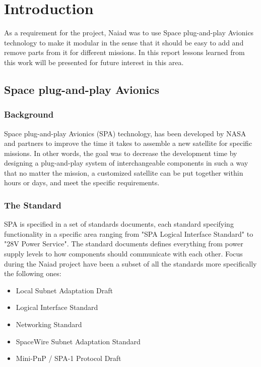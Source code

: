 \section{Introduction}\label{sec:introduction}
As a requirement for the project, Naiad was to use
Space plug-and-play Avionics technology to make it modular in the sense that
it should be easy to add and remove parts from it for different missions. In
this report lessons learned from this work will be presented for future
interest in this area.

\subsection{Space plug-and-play Avionics}
\subsubsection{Background}
Space plug-and-play Avionics (SPA) technology, has been developed by NASA and partners to improve the time it takes to assemble a new satellite for specific missions. In other words, the goal was to decrease the development time by designing a plug-and-play system of interchangeable components in such a way that no matter the mission, a customized satellite can be put together within hours or days, and meet the specific requirements.

\subsubsection{The Standard}
SPA is specified in a set of standards documents, each standard specifying
functionality in a specific area ranging from "SPA Logical Interface Standard"
to "28V Power Service". The standard documents defines everything from power
supply levels to how components should communicate with each other.
Focus during the Naiad project have
been a subset of all the standards more specifically the following ones:

\begin{itemize}
  \item Local Subnet Adaptation Draft
  \item Logical Interface Standard \cite{spa:logical_interface}
  \item Networking Standard \cite{spa:networking}
  \item SpaceWire Subnet Adaptation Standard \cite{spa:spacewire}
  \item Mini-PnP / SPA-1 Protocol Draft
\end{itemize}

